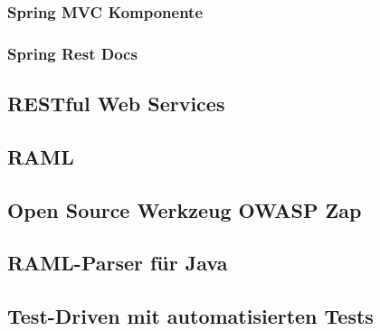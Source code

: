 \subsubsection{Spring MVC Komponente}

\subsubsection{Spring Rest Docs}

\subsection{RESTful Web Services}

\subsection{RAML}

\subsection{Open Source Werkzeug OWASP Zap}

\subsection{RAML-Parser für Java}

\subsection{Test-Driven mit automatisierten Tests}

